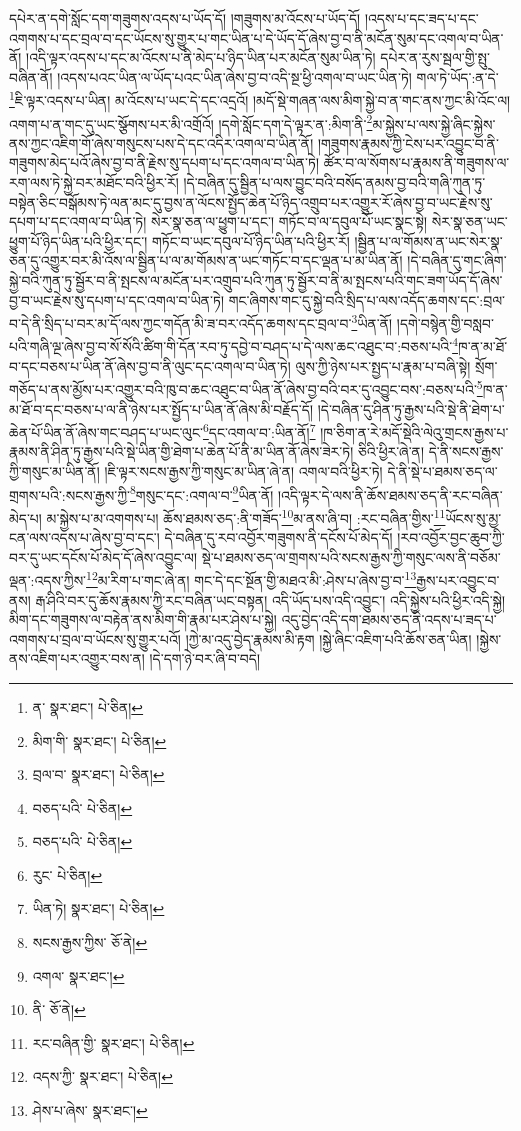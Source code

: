 དཔེར་ན་དགེ་སློང་དག་གཟུགས་འདས་པ་ཡོད་དོ། །གཟུགས་མ་འོངས་པ་ཡོད་དོ། །འདས་པ་དང་ཟད་པ་དང་འགགས་པ་དང་བྲལ་བ་དང་ཡོངས་སུ་གྱུར་པ་གང་ཡིན་པ་དེ་ཡོད་དོ་ཞེས་བྱ་བ་ནི་མངོན་སུམ་དང་འགལ་བ་ཡིན་ནོ། །འདི་ལྟར་འདས་པ་དང་མ་འོངས་པ་ནི་མེད་པ་ཉིད་ཡིན་པར་མངོན་སུམ་ཡིན་ཏེ། དཔེར་ན་རུས་སྦལ་གྱི་སྤུ་བཞིན་ནོ། །འདས་པའང་ཡིན་ལ་ཡོད་པའང་ཡིན་ཞེས་བྱ་བ་འདི་སྔ་ཕྱི་འགལ་བ་ཡང་ཡིན་ཏེ། གལ་ཏེ་ཡོད་:ན་དེ་\footnote{ན་  སྣར་ཐང་།  པེ་ཅིན། }ཇི་ལྟར་འདས་པ་ཡིན། མ་འོངས་པ་ཡང་དེ་དང་འདྲའོ། །མདོ་སྡེ་གཞན་ལས་མིག་སྐྱེ་བ་ན་གང་ནས་ཀྱང་མི་འོང་ལ། འགག་པ་ན་གང་དུ་ཡང་སྩོགས་པར་མི་འགྲོའོ། །དགེ་སློང་དག་དེ་ལྟར་ན་:མིག་ནི་\footnote{མིག་གི་  སྣར་ཐང་།  པེ་ཅིན། }མ་སྐྱེས་པ་ལས་སྐྱེ་ཞིང་སྐྱེས་ནས་ཀྱང་འཇིག་གོ་ཞེས་གསུངས་པས་དེ་དང་འདིར་འགལ་བ་ཡིན་ནོ། །གཟུགས་རྣམས་ཀྱི་ངེས་པར་འབྱུང་བ་ནི་གཟུགས་མེད་པའོ་ཞེས་བྱ་བ་ནི་རྗེས་སུ་དཔག་པ་དང་འགལ་བ་ཡིན་ཏེ། ཚོར་བ་ལ་སོགས་པ་རྣམས་ནི་གཟུགས་ལ་རག་ལས་ཏེ་སྐྱེ་བར་མཐོང་བའི་ཕྱིར་རོ། །དེ་བཞིན་དུ་སྦྱིན་པ་ལས་བྱུང་བའི་བསོད་ནམས་བྱ་བའི་གཞི་ཀུན་ཏུ་བསྟེན་ཅིང་བསྒོམས་ཏེ་ལན་མང་དུ་བྱས་ན་ལོངས་སྤྱོད་ཆེན་པོ་ཉིད་འགྲུབ་པར་འགྱུར་རོ་ཞེས་བྱ་བ་ཡང་རྗེས་སུ་དཔག་པ་དང་འགལ་བ་ཡིན་ཏེ། སེར་སྣ་ཅན་ལ་ཕྱུག་པ་དང་། གཏོང་བ་ལ་དབུལ་པོ་ཡང་སྣང་སྟེ། སེར་སྣ་ཅན་ཡང་ཕྱུག་པོ་ཉིད་ཡིན་པའི་ཕྱིར་དང་། གཏོང་བ་ཡང་དབུལ་པོ་ཉིད་ཡིན་པའི་ཕྱིར་རོ། །སྦྱིན་པ་ལ་གོམས་ན་ཡང་སེར་སྣ་ཅན་དུ་འགྱུར་བར་མི་འོས་ལ་སྦྱིན་པ་ལ་མ་གོམས་ན་ཡང་གཏོང་བ་དང་ལྡན་པ་མ་ཡིན་ནོ། །དེ་བཞིན་དུ་གང་ཞིག་སྐྱེ་བའི་ཀུན་ཏུ་སྦྱོར་བ་ནི་སྤངས་ལ་མངོན་པར་འགྲུབ་པའི་ཀུན་ཏུ་སྦྱོར་བ་ནི་མ་སྤངས་པའི་གང་ཟག་ཡོད་དོ་ཞེས་བྱ་བ་ཡང་རྗེས་སུ་དཔག་པ་དང་འགལ་བ་ཡིན་ཏེ། གང་ཞིགས་གང་དུ་སྐྱེ་བའི་སྲིད་པ་ལས་འདོད་ཆགས་དང་:བྲལ་བ་དེ་ནི་སྲིད་པ་བར་མ་དོ་ལས་ཀྱང་གདོན་མི་ཟ་བར་འདོད་ཆགས་དང་བྲལ་བ་\footnote{བྲལ་བ་  སྣར་ཐང་།  པེ་ཅིན། }ཡིན་ནོ། །དགེ་བསྙེན་གྱི་བསླབ་པའི་གཞི་ལྔ་ཞེས་བྱ་བ་སོ་སོའི་ཚིག་གི་དོན་རབ་ཏུ་དབྱེ་བ་བཤད་པ་དེ་ལས་ཆང་འཐུང་བ་:བཅས་པའི་\footnote{བཅད་པའི་  པེ་ཅིན། }ཁ་ན་མ་ཐོ་བ་དང་བཅས་པ་ཡིན་ནོ་ཞེས་བྱ་བ་ནི་ལུང་དང་འགལ་བ་ཡིན་ཏེ། ལུས་ཀྱི་ཉེས་པར་སྤྱད་པ་རྣམ་པ་བཞི་སྟེ། སྲོག་གཅོད་པ་ནས་མྱོས་པར་འགྱུར་བའི་ཁུ་བ་ཆང་འཐུང་བ་ཡིན་ནོ་ཞེས་བྱ་བའི་བར་དུ་འབྱུང་བས་:བཅས་པའི་\footnote{བཅད་པའི་  པེ་ཅིན། }ཁ་ན་མ་ཐོ་བ་དང་བཅས་པ་ལ་ནི་ཉེས་པར་སྤྱོད་པ་ཡིན་ནོ་ཞེས་མི་བརྗོད་དོ། །དེ་བཞིན་དུ་ཤིན་ཏུ་རྒྱས་པའི་སྡེ་ནི་ཐེག་པ་ཆེན་པོ་ཡིན་ནོ་ཞེས་གང་བཤད་པ་ཡང་ལུང་\footnote{རུང་  པེ་ཅིན། }དང་འགལ་བ་:ཡིན་ནོ།\footnote{ཡིན་ཏེ།  སྣར་ཐང་།  པེ་ཅིན། } །ཁ་ཅིག་ན་རེ་མདོ་སྡེའི་ལེའུ་གྲངས་རྒྱས་པ་རྣམས་ནི་ཤིན་ཏུ་རྒྱས་པའི་སྡེ་ཡིན་གྱི་ཐེག་པ་ཆེན་པོ་ནི་མ་ཡིན་ནོ་ཞེས་ཟེར་ཏེ། ཅིའི་ཕྱིར་ཞེ་ན། དེ་ནི་སངས་རྒྱས་ཀྱི་གསུང་མ་ཡིན་ནོ། །ཇི་ལྟར་སངས་རྒྱས་ཀྱི་གསུང་མ་ཡིན་ཞེ་ན། འགལ་བའི་ཕྱིར་ཏེ། དེ་ནི་སྡེ་པ་ཐམས་ཅད་ལ་གྲགས་པའི་:སངས་རྒྱས་ཀྱི་\footnote{སངས་རྒྱས་ཀྱིས་  ཅོ་ནེ། }གསུང་དང་:འགལ་བ་\footnote{འགལ་  སྣར་ཐང་། }ཡིན་ནོ། །འདི་ལྟར་དེ་ལས་ནི་ཆོས་ཐམས་ཅད་ནི་རང་བཞིན་མེད་པ། མ་སྐྱེས་པ་མ་འགགས་པ། ཆོས་ཐམས་ཅད་:ནི་གཟོད་\footnote{ནི་  ཅོ་ནེ། }མ་ནས་ཞི་བ། :རང་བཞིན་གྱིས་\footnote{རང་བཞིན་གྱི་  སྣར་ཐང་།  པེ་ཅིན། }ཡོངས་སུ་མྱ་ངན་ལས་འདས་པ་ཞེས་བྱ་བ་དང་། དེ་བཞིན་དུ་རབ་འབྱོར་གཟུགས་ནི་དངོས་པོ་མེད་དོ། །རབ་འབྱོར་བྱང་ཆུབ་ཀྱི་བར་དུ་ཡང་དངོས་པོ་མེད་དོ་ཞེས་འབྱུང་ལ། སྡེ་པ་ཐམས་ཅད་ལ་གྲགས་པའི་སངས་རྒྱས་ཀྱི་གསུང་ལས་ནི་བཅོམ་ལྡན་:འདས་ཀྱིས་\footnote{འདས་ཀྱི་  སྣར་ཐང་།  པེ་ཅིན། }མ་རིག་པ་གང་ཞེ་ན། གང་དེ་དང་སྔོན་གྱི་མཐའ་མི་:ཤེས་པ་ཞེས་བྱ་བ་\footnote{ཤེས་པ་ཞེས་  སྣར་ཐང་། }རྒྱས་པར་འབྱུང་བ་ནས། རྒ་ཤིའི་བར་དུ་ཆོས་རྣམས་ཀྱི་རང་བཞིན་ཡང་བསྟན། འདི་ཡོད་པས་འདི་འབྱུང་། འདི་སྐྱེས་པའི་ཕྱིར་འདི་སྐྱེ། མིག་དང་གཟུགས་ལ་བརྟེན་ནས་མིག་གི་རྣམ་པར་ཤེས་པ་སྐྱེ། འདུ་བྱེད་འདི་དག་ཐམས་ཅད་ནི་འདས་པ་ཟད་པ་འགགས་པ་བྲལ་བ་ཡོངས་སུ་གྱུར་པའོ། །ཀྱེ་མ་འདུ་བྱེད་རྣམས་མི་རྟག །སྐྱེ་ཞིང་འཇིག་པའི་ཆོས་ཅན་ཡིན། །སྐྱེས་ནས་འཇིག་པར་འགྱུར་བས་ན། །དེ་དག་ཉེ་བར་ཞི་བ་བདེ། 